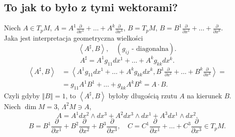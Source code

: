 \documentclass[../main.tex]{subfiles}
\begin{document}
\subsection{To jak to było z tymi wektorami?}
Niech $A\in T_pM$,  $A = A^1 \frac{\partial }{\partial x^1} + \ldots + A^k \frac{\partial }{\partial x^k} $, $B = T_pM$, $B = B^1 \frac{\partial }{\partial x^1} + \ldots + \frac{\partial }{\partial x^k}$.\\
Jaka jest interpretacja geometryczna wielkości
\[
    \left<A^\sharp, B \right>,\quad (g_{ij}\text{ - diagonalna})
.\]
\[
A^\sharp = A^1g_{11}dx^1 + \ldots + A^kg_{kk}dx^k
.\]
\begin{align*}
    \left<A^\sharp, B \right> &= \left<A^1g_{11}dx^1 + \ldots + A^k g_{kk}dx^k, B^1 \frac{\partial }{\partial x^1} + \ldots + B^k \frac{\partial }{\partial x^k}  \right> = \\
    &=  g_{11}A^1B^1 + \ldots + g_{kk}A^kB^k = A\cdot B
.\end{align*}
Czyli gdyby $\left\Vert B \right\Vert = 1$, to $\left<A^\sharp, B \right>$ byłoby długością rzutu $A$ na kierunek $B$.\\
Niech $\dim M = 3$, $\Lambda^2M\ni A$,
\[
A = A^1 dx^2\land dx^3 + A^2dx^3\land dx^1 + A^3dx^1\land dx^2
.\]
\[
B = B^1 \frac{\partial }{\partial x^1} + B^2 \frac{\partial }{\partial x^2} + B^3 \frac{\partial }{\partial x^3},\quad C = C^1 \frac{\partial }{\partial x^1} + \ldots + C^3 \frac{\partial }{\partial x^3} \in T_pM
.\]
\end{document}

